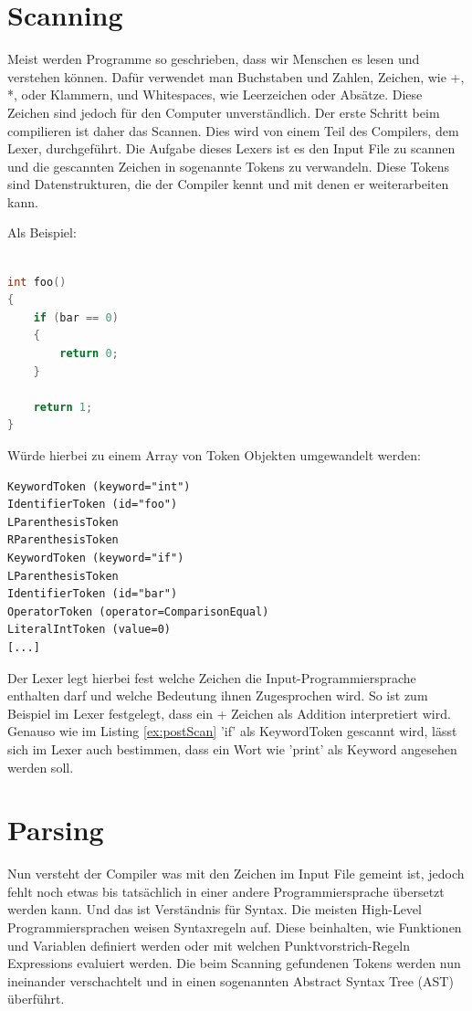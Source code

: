 \section{Scanning}
Meist werden Programme so geschrieben, dass wir Menschen es lesen und verstehen können. Dafür verwendet man Buchstaben und Zahlen, Zeichen, wie +, *, oder Klammern, und Whitespaces, wie Leerzeichen oder Absätze.
Diese Zeichen sind jedoch für den Computer unverständlich. Der erste Schritt beim compilieren ist daher das Scannen. Dies wird von einem Teil des Compilers, dem Lexer, durchgeführt.
Die Aufgabe dieses Lexers ist es den Input File zu scannen und die gescannten Zeichen in sogenannte Tokens zu verwandeln. Diese Tokens sind Datenstrukturen, die der Compiler kennt und mit denen er weiterarbeiten kann.

Als Beispiel:

\begin{lstlisting}[language=C, label=ex:preScan, caption=C code vor dem Scannen]

int foo()
{
    if (bar == 0)
    {
        return 0;
    }

    return 1;
}

\end{lstlisting}

Würde hierbei zu einem Array von Token Objekten umgewandelt werden:

\begin{lstlisting}[label=ex:postScan, caption=Tokens nach dem Scannen]
KeywordToken (keyword="int")
IdentifierToken (id="foo")
LParenthesisToken
RParenthesisToken
KeywordToken (keyword="if")
LParenthesisToken
IdentifierToken (id="bar")
OperatorToken (operator=ComparisonEqual)
LiteralIntToken (value=0)
[...]
\end{lstlisting}

Der Lexer legt hierbei fest welche Zeichen die Input-Programmiersprache enthalten darf und welche Bedeutung ihnen Zugesprochen wird. So ist zum Beispiel im Lexer festgelegt, dass ein + Zeichen als Addition interpretiert wird.
Genauso wie im Listing \ref{ex:postScan} 'if' als KeywordToken gescannt wird, lässt sich im Lexer auch bestimmen, dass ein Wort wie 'print' als Keyword angesehen werden soll.

\section{Parsing}
Nun versteht der Compiler was mit den Zeichen im Input File gemeint ist, jedoch fehlt noch etwas bis tatsächlich in einer andere Programmiersprache übersetzt werden kann. Und das ist Verständnis für Syntax.
Die meisten High-Level Programmiersprachen weisen Syntaxregeln auf. Diese beinhalten, wie Funktionen und Variablen definiert werden oder mit welchen Punktvorstrich-Regeln Expressions evaluiert werden.
Die beim Scanning gefundenen Tokens werden nun ineinander verschachtelt und in einen sogenannten Abstract Syntax Tree (AST) überführt.

